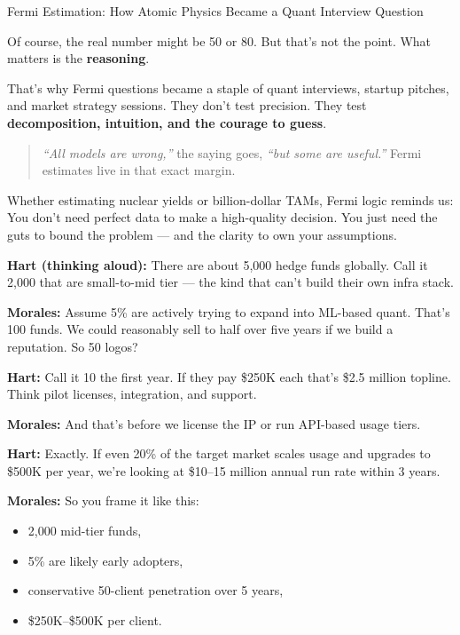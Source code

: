 \begin{HistoricalSidebar}{Fermi Estimation: How Atomic Physics Became a Quant Interview Question}
  \medskip
  
  Of course, the real number might be 50 or 80. But that’s not the point.  
  What matters is the \textbf{reasoning}.
  
  \medskip
  
  That’s why Fermi questions became a staple of quant interviews, startup pitches, and market strategy sessions.  
  They don’t test precision.  
  They test \textbf{decomposition, intuition, and the courage to guess}.
  
  \begin{quote}
  \textit{“All models are wrong,”} the saying goes, \textit{“but some are useful.”}  
  Fermi estimates live in that exact margin.
  \end{quote}
  
  \medskip
  
  Whether estimating nuclear yields or billion-dollar TAMs, Fermi logic reminds us:  
  You don’t need perfect data to make a high-quality decision.  
  You just need the guts to bound the problem — and the clarity to own your assumptions.
  
\end{HistoricalSidebar}
  


\textbf{Hart (thinking aloud):}  
There are about 5,000 hedge funds globally. Call it 2,000 that are small-to-mid tier — the kind that can’t build their own 
infra stack.

\textbf{Morales:}  
Assume 5\% are actively trying to expand into ML-based quant. That’s 100 funds.
We could reasonably sell to half over five years if we build a reputation. So 50 logos?

\textbf{Hart:}  
Call it 10 the first year. If they pay \$250K each that’s \$2.5 million topline.
Think pilot licenses, integration, and support.

\textbf{Morales:}  
And that’s before we license the IP or run API-based usage tiers.

\textbf{Hart:}  
Exactly. If even 20\% of the target market scales usage and upgrades to \$500K per year, we’re looking at \$10–15 
million annual run rate within 3 years.

\textbf{Morales:}  
So you frame it like this:  
\begin{itemize}
  \item 2,000 mid-tier funds,  
  \item 5\% are likely early adopters,  
  \item conservative 50-client penetration over 5 years,  
  \item \$250K–\$500K per client.
\end{itemize}


